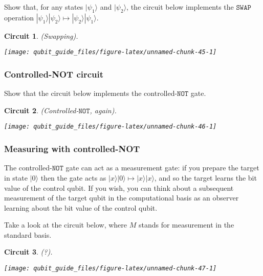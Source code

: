 \documentclass[fleqn]{article}
\newtheorem*{circuit}{Circuit}
\begin{document}
Show that, for any states \(|\psi_1\rangle\) and \(|\psi_2\rangle\), the circuit below implements the \(\texttt{SWAP}\) operation \(|\psi_1\rangle|\psi_2\rangle \mapsto |\psi_2\rangle|\psi_1\rangle\).

\begin{circuit}

(Swapping).

\begin{center}\texttt{[image: qubit\_guide\_files/figure-latex/unnamed-chunk-45-1]} \end{center}


\end{circuit}

\hypertarget{controlled-not-circuit}{%
\subsubsection{Controlled-NOT circuit}\label{controlled-not-circuit}}

Show that the circuit below implements the controlled-\(\texttt{NOT}\) gate.

\begin{circuit}

(Controlled-\(\texttt{NOT}\), again).

\begin{center}\texttt{[image: qubit\_guide\_files/figure-latex/unnamed-chunk-46-1]} \end{center}


\end{circuit}

\hypertarget{measuring-with-controlled-not}{%
\subsubsection{Measuring with controlled-NOT}\label{measuring-with-controlled-not}}

The controlled-\(\texttt{NOT}\) gate can act as a measurement gate: if you prepare the target in state \(|0\rangle\) then the gate acts as \(|x\rangle|0\rangle\mapsto|x\rangle|x\rangle\), and so the target learns the bit value of the control qubit.
If you wish, you can think about a subsequent measurement of the target qubit in the computational basis as an observer learning about the bit value of the control qubit.

Take a look at the circuit below, where \(M\) stands for measurement in the standard basis.

\begin{circuit}

(?).

\begin{center}\texttt{[image: qubit\_guide\_files/figure-latex/unnamed-chunk-47-1]} \end{center}


\end{circuit}
\end{document}
